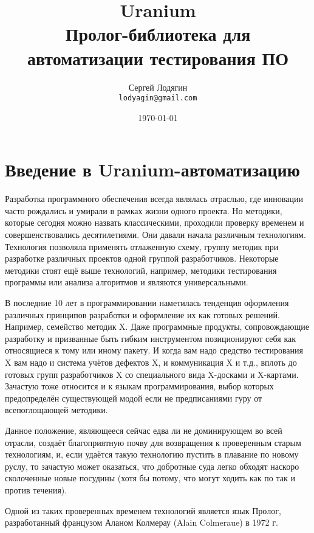 \documentclass[a4paper]{book}
\def\td{т.\thinspace д.}
\def\ur{Uranium}
\begin{document}
\title{{\bf\ur}\\ \medskip  Пролог-библиотека для автоматизации
  тестирования ПО}
\author{Сергей Лодягин\\ \texttt{lodyagin@gmail.com}}
\date{\today}
\maketitle

\tableofcontents

\chapter{Введение в \ur-автоматизацию}

Разработка программного обеспечения всегда являлась отраслью, где
инновации часто рождались и умирали в рамках жизни одного
проекта. Но методики, которые сегодня можно назвать
классическими, проходили проверку временем и совершенствовались
десятилетиями. Они давали начала различным
технологиям. Технология позволяла применять отлаженную схему,
группу методик при разработке различных проектов одной группой
разработчиков. Некоторые методики стоят ещё выше технологий,
например, методики тестирования программы или анализа алгоритмов
и являются универсальными.

В последние 10 лет в программировании наметилась тенденция
оформления различных принципов разработки и оформление их как
готовых решений. Например, семейство методик X. Даже программные
продукты, сопровождающие разработку и призванные быть гибким
инструментом позиционируют себя как относящиеся к тому или иному
пакету. И когда вам надо средство тестирования X вам надо и
система учётов дефектов X, и коммуникация X и \td, вплоть до
готовых групп разработчиков X со специального вида X-досками и
X-картами.  Зачастую тоже относится и к языкам программирования,
выбор которых предопределён существующей модой если не
предписаниями гуру от всепоглощающей методики.

Данное положение, являющееся сейчас едва ли не доминирующем во
всей отрасли, создаёт благоприятную почву для возвращения к
проверенным старым технологиям, и, если удаётся такую технологию
пустить в плавание по новому руслу, то зачастую может оказаться,
что добротные суда легко обходят наскоро сколоченные новые
посудины (хотя бы потому, что могут ходить как по так и против
течения).

Одной из таких проверенных временем технологий является язык
Пролог, разработанный французом Аланом Колмерау (Alain Colmeraue)
в 1972 г.
\end{document}
